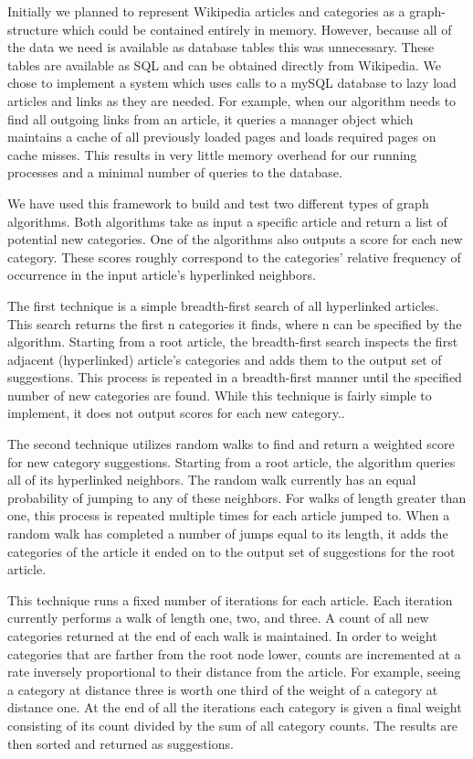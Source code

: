 \documentclass{sig-alternate}
\begin{document}
Initially we planned to represent Wikipedia articles and categories as a graph-structure which could be contained entirely in memory. However, because all of the data we need is available as database tables this was unnecessary. These tables are available as SQL and can be obtained directly from Wikipedia. We chose to implement a system which uses calls to a mySQL database to lazy load articles and links as they are needed. For example, when our algorithm needs to find all outgoing links from an article, it queries a manager object which maintains a cache of all previously loaded pages and loads required pages on cache misses. This results in very little memory overhead for our running processes and a minimal number of queries to the database.

We have used this framework to build and test two different types of graph algorithms. Both algorithms take as input a specific article and return a list of potential new categories. One of the algorithms also outputs a score for each new category. These scores roughly correspond to the categories' relative frequency of occurrence in the input article's hyperlinked neighbors.

The first technique is a simple breadth-first search of all hyperlinked articles. This search returns the first n categories it finds, where n can be specified by the algorithm. Starting from a root article, the breadth-first search inspects the first adjacent (hyperlinked) article's categories and adds them to the output set of suggestions. This process is repeated in a breadth-first manner until the specified number of new categories are found. While this technique is fairly simple to implement, it does not output scores for each new category..

The second technique utilizes random walks to find and return a weighted score for new category suggestions. Starting from a root article, the algorithm queries all of its hyperlinked neighbors. The random walk currently has an equal probability of jumping to any of these neighbors. For walks of length greater than one, this process is repeated multiple times for each article jumped to. When a random walk has completed a number of jumps equal to its length, it adds the categories of the article it ended on to the output set of suggestions for the root article.

This technique runs a fixed number of iterations for each article. Each iteration currently performs a walk of length one, two, and three. A count of all new categories returned at the end of each walk is maintained. In order to weight categories that are farther from the root node lower, counts are incremented at a rate inversely proportional to their distance from the article. For example, seeing a category at distance three is worth one third of the weight of a category at distance one. At the end of all the iterations each category is given a final weight consisting of its count divided by the sum of all category counts. The results are then sorted and returned as suggestions.
\end{document}
